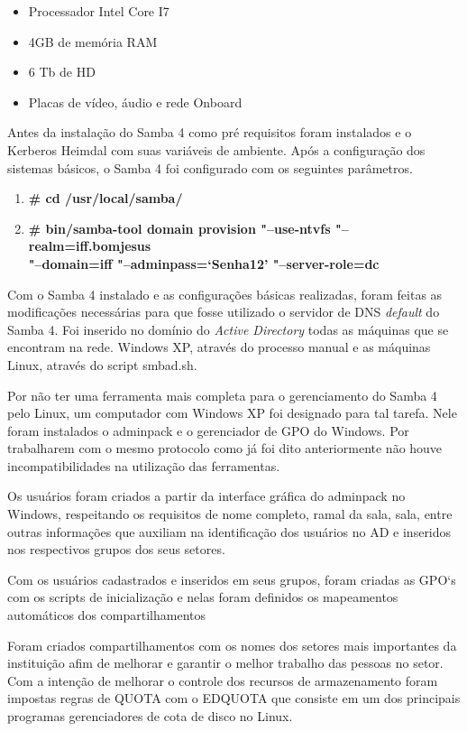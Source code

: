 \begin{itemize}
	\item{Processador Intel Core I7\textregistered}
	\item{4GB de memória RAM}
	\item{6 Tb de HD}
	\item{Placas de vídeo, áudio e rede Onboard}
\end{itemize}

Antes da instalação do Samba 4 como pré requisitos foram instalados e o Kerberos Heimdal com suas variáveis de ambiente.
Após a configuração dos sistemas básicos, o Samba 4 foi configurado com os seguintes parâmetros.

\begin{enumerate}
	\item \textbf{\# cd /usr/local/samba/}
	\item \textbf{\# bin/samba-tool domain provision "--use-ntvfs "--realm=iff.bomjesus\\"--domain=iff  "--adminpass=`Senha12' "--server-role=dc}
\end{enumerate}

Com o Samba 4 instalado e as configurações básicas realizadas, foram feitas as modificações necessárias para que fosse utilizado o servidor de DNS \textit{default} do Samba 4. Foi inserido no domínio do \textit{Active Directory} todas as máquinas que se encontram na rede. Windows XP, através do processo manual e as máquinas Linux, através do script smbad.sh.

Por não ter uma ferramenta mais completa para o gerenciamento do Samba 4 pelo Linux, um computador com Windows XP foi designado para tal tarefa. Nele foram instalados o adminpack e o gerenciador de GPO do Windows. Por trabalharem com o mesmo protocolo como já foi dito anteriormente não houve incompatibilidades na utilização das ferramentas.

Os usuários foram criados a partir da interface gráfica do adminpack no Windows, respeitando os requisitos de nome completo, ramal da sala, sala, entre outras informações que auxiliam na identificação dos usuários no AD e inseridos nos respectivos grupos dos seus setores.

Com os usuários cadastrados e inseridos em seus grupos, foram criadas as GPO`s com os scripts de inicialização e nelas foram definidos os mapeamentos automáticos dos compartilhamentos

Foram criados compartilhamentos com os nomes dos setores mais importantes da instituição afim de melhorar e garantir o melhor trabalho das pessoas no setor. Com a intenção de melhorar o controle dos recursos de armazenamento foram impostas regras de QUOTA com o EDQUOTA que consiste em um dos principais programas gerenciadores de cota de disco no Linux.

